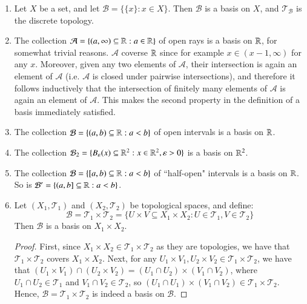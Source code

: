 \documentclass[12pt, a4paper, oneside, openright, titlepage]{book}
\begin{document}
\begin{example}
    \leavevmode
    \begin{enumerate}
        \item Let $X$ be a set, and let $\mathcal{B} = \{\{x\}:x \in X\}$. Then $\mathcal{B}$ is a basis on $X$, and $\mathcal{T}_{\mathcal{B}}$ is the discrete topology.
        \item The collection $\mathcal{A} = \{(a,\infty)\subseteq \mathbb R:a \in \mathbb R\}$ of open rays is a basis on $\mathbb R$, for somewhat trivial reasons. $\mathcal{A}$ coverse $\mathbb R$ since for example $x \in (x-1,\infty)$ for any $x$. Moreover, given any two elements of $\mathcal{A}$, their intersection is again an element of $\mathcal{A}$ (i.e. $\mathcal{A}$ is closed under pairwise intersections), and therefore it follows inductively that the intersection of finitely many elements of $\mathcal{A}$ is again an element of $\mathcal{A}$. This makes the second property in the definition of a basis immediately satisfied. 
        \item The collection $\mathcal{B} = \{(a,b) \subseteq \mathbb R:a <b\}$ of open intervals is a basis on $\mathbb R$.
        \item The collection $\mathcal{B}_2 = \{B_{\varepsilon}(x) \subseteq \mathbb R^2:x \in \mathbb R^2,\varepsilon > 0\}$ is a basis on $\mathbb R^2$.
        \item The collection $\mathcal{B} = \{[a,b)\subseteq \mathbb R:a < b\}$ of ``half-open" intervals is a basis on $\mathbb R$. So is $\mathcal{B}' = \{(a,b]\subseteq \mathbb R:a<b\}$.
        \item Let $(X_1,\mathcal{T}_1)$ and $(X_2,\mathcal{T}_2)$ be topological spaces, and define: \begin{equation*}
                \mathcal{B} = \mathcal{T}_1\times \mathcal{T}_2 = \{U\times V\subseteq X_1\times X_2: U\in \mathcal{T}_1,V\in\mathcal{T}_2\}
        \end{equation*}
            Then $\mathcal{B}$ is a basis on $X_1\times X_2$.
            \begin{proof}
                First, since $X_1\times X_2 \in \mathcal{T}_1\times \mathcal{T}_2$ as they are topologies, we have that $\mathcal{T}_1\times \mathcal{T}_2$ covers $X_1\times X_2$. Next, for any $U_1\times V_1, U_2\times V_2 \in \mathcal{T}_1\times \mathcal{T}_2$, we have that $(U_1\times V_1)\cap(U_2\times V_2) = (U_1\cap U_2)\times (V_1\cap V_2)$, where $U_1\cap U_2 \in \mathcal{T}_1$ and $V_1\cap V_2 \in \mathcal{T}_2$, so $(U_1\cap U_1)\times (V_1\cap V_2) \in \mathcal{T}_1\times \mathcal{T}_2$. Hence, $\mathcal{B} = \mathcal{T}_1\times \mathcal{T}_2$ is indeed a basis on $\mathcal{B}$.

\end{proof}
\end{enumerate}
\end{example}
\end{document}
